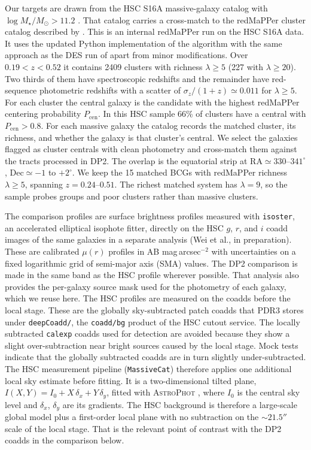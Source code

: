 \documentclass[SE,lsstdraft,authoryear,toc]{lsstdoc}
\begin{document}
Our targets are drawn from the HSC S16A massive-galaxy catalog with $\log M_\star/M_\odot > 11.2$ \citep{huangOuterStellarMass2022}. That catalog carries a cross-match to the redMaPPer cluster catalog described by \citet{huangOuterStellarMass2022}. This is an internal redMaPPer run on the HSC S16A data. It uses the updated Python implementation of the algorithm with the same approach as the DES run of \citet{2016ApJS..224....1R} apart from minor modifications. Over $0.19 < z < 0.52$ it contains 2409 clusters with richness $\lambda \ge 5$ (227 with $\lambda \ge 20$). Two thirds of them have spectroscopic redshifts and the remainder have red-sequence photometric redshifts with a scatter of $\sigma_z/(1+z) \simeq 0.011$ for $\lambda \ge 5$. For each cluster the central galaxy is the candidate with the highest redMaPPer centering probability $P_\mathrm{cen}$. In this HSC sample 66\% of clusters have a central with $P_\mathrm{cen} > 0.8$. For each massive galaxy the catalog records the matched cluster, its richness, and whether the galaxy is that cluster's central. We select the galaxies flagged as cluster centrals with clean photometry and cross-match them against the tracts processed in DP2. The overlap is the equatorial strip at $\mathrm{RA} \simeq 330$--$341^\circ$, $\mathrm{Dec} \simeq -1$ to $+2^\circ$. We keep the 15 matched BCGs with redMaPPer richness $\lambda \ge 5$, spanning $z = 0.24$--$0.51$. The richest matched system has $\lambda = 9$, so the sample probes groups and poor clusters rather than massive clusters.

The comparison profiles are surface brightness profiles measured with \texttt{isoster}, an accelerated elliptical isophote fitter, directly on the HSC $g$, $r$, and $i$ coadd images of the same galaxies in a separate analysis (Wei et al., in preparation). These are calibrated $\mu(r)$ profiles in AB mag\,arcsec$^{-2}$ with uncertainties on a fixed logarithmic grid of semi-major axis (SMA) values. The DP2 comparison is made in the same band as the HSC profile wherever possible. That analysis also provides the per-galaxy source mask used for the photometry of each galaxy, which we reuse here. The HSC profiles are measured on the coadds before the local stage. These are the globally sky-subtracted patch coadds that PDR3 stores under \texttt{deepCoadd/}, the \texttt{coadd/bg} product of the HSC cutout service. The locally subtracted \texttt{calexp} coadds used for detection are avoided because they show a slight over-subtraction near bright sources caused by the local stage. Mock tests indicate that the globally subtracted coadds are in turn slightly under-subtracted. The HSC measurement pipeline (\texttt{MassiveCat}) therefore applies one additional local sky estimate before fitting. It is a two-dimensional tilted plane, $I(X,Y) = I_0 + X\,\delta_x + Y\,\delta_y$, fitted with \textsc{AstroPhot} \citep{2023MNRAS.525.6377S}, where $I_0$ is the central sky level and $\delta_x$, $\delta_y$ are its gradients. The HSC background is therefore a large-scale global model plus a first-order local plane with no subtraction on the $\sim 21.5''$ scale of the local stage. That is the relevant point of contrast with the DP2 coadds in the comparison below.
\end{document}
